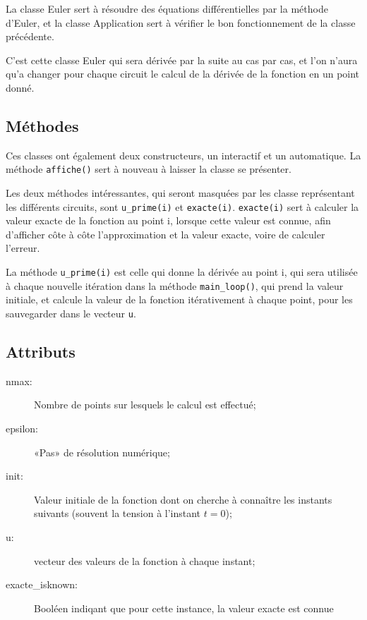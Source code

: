 \documentclass{report}
\begin{document}
        La classe Euler sert à résoudre des équations différentielles par la méthode d’Euler, et la classe
        Application sert à vérifier le bon fonctionnement de la classe précédente.

        C’est cette classe Euler qui sera dérivée par la suite au cas par cas, et l’on n’aura qu’a changer
        pour chaque circuit le calcul de la dérivée de la fonction en un point donné.

        \subsection{Méthodes}

        Ces classes ont également deux constructeurs, un interactif et un automatique. La méthode \verb|affiche()|
        sert à nouveau à laisser la classe se présenter.

        Les deux méthodes intéressantes, qui seront masquées par les classe représentant les différents circuits,
        sont \verb|u_prime(i)| et \verb|exacte(i)|. \verb|exacte(i)| sert à calculer la valeur exacte de la fonction
        au point i, lorsque cette valeur est connue, afin d’afficher côte à côte l’approximation et la valeur exacte,
        voire de calculer l’erreur.

        La méthode \verb|u_prime(i)| est celle qui donne la dérivée au point i, qui sera utilisée à chaque nouvelle
        itération dans la méthode \verb|main_loop()|, qui prend la valeur initiale, et calcule la valeur de la fonction
        itérativement à chaque point, pour les sauvegarder dans le vecteur \verb|u|.

        \subsection{Attributs}

        \begin{description}
            \item[nmax:] Nombre de points sur lesquels le calcul est effectué;
            \item[epsilon:] «Pas» de résolution numérique;
            \item[init:] Valeur initiale de la fonction dont on cherche à connaître les instants suivants
                (souvent la tension à l’instant $t=0$);
            \item[u:] vecteur des valeurs de la fonction à chaque instant;
            \item[exacte\_isknown:] Booléen indiqant que pour cette instance, la valeur exacte est connue
        \end{description}
\end{document}
